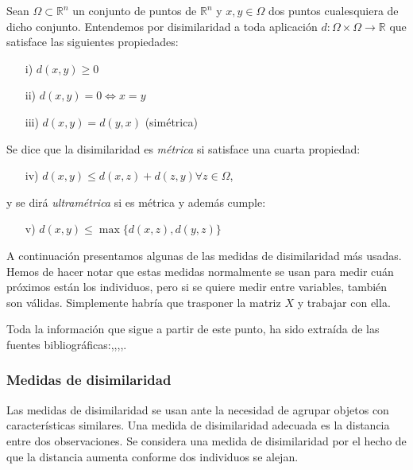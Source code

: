 \begin{definicion}
    Sean $\Omega \subset \mathbb{R}^{n}$ un conjunto de puntos de $\mathbb{R}^{n}$ y $x,y \in \Omega$ dos puntos cualesquiera de dicho conjunto. Entendemos por disimilaridad a toda 
    aplicación $d: \Omega \times \Omega \longrightarrow \mathbb{R}$ que satisface las siguientes propiedades:

    \begin{itemize}
        \item[i)] $d(x,y) \ge 0$
        \item[ii)] $d(x,y)= 0 \Longleftrightarrow x = y$
        \item[iii)] $d(x,y) = d(y,x)$ (simétrica)
    \end{itemize}
    Se dice que la disimilaridad es \textit{métrica} si satisface una cuarta propiedad:
    \begin{itemize}
        \item[iv)] $d(x,y) \leq d(x,z) + d(z,y) \forall z \in \Omega$, 
    \end{itemize}
        
    y se dirá \textit{ultramétrica} si es métrica y además cumple:
        
    \begin{itemize}
        \item[v)] $d(x,y) \leq \max\{d(x,z),d(y,z)\}$
    \end{itemize}
        
\end{definicion}


A continuación presentamos algunas de las medidas de disimilaridad más usadas. Hemos de hacer notar que estas medidas normalmente se usan para medir cuán próximos están los individuos, 
pero si se quiere medir entre variables, también son válidas. Simplemente habría que trasponer la matriz $X$ y trabajar con ella. \newline

Toda la información que sigue a partir de este punto, ha sido extraída de las fuentes bibliográficas:\cite{Bib-1},\cite{Bib-5},\cite{Bib-6},\cite{clustering-2},\cite{clustering-1}.

\subsubsection{Medidas de disimilaridad}   %

Las medidas de disimilaridad se usan ante la necesidad de agrupar objetos con características similares. Una medida de disimilaridad adecuada es la distancia entre 
dos observaciones. Se considera una medida de disimilaridad por el hecho de que la distancia aumenta conforme dos individuos se alejan. \newline

